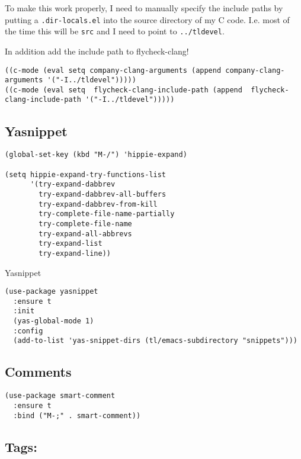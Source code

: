 \documentclass[12pt]{article}
\begin{document}
To make this work properly, I need to manually specify the include paths by
putting a \texttt{.dir-locals.el} into the source directory of my C code. I.e. most
of the time this will be \texttt{src} and I need to point to \texttt{../tldevel}. 

In addition add the include path to flycheck-clang! 

\begin{verbatim}
((c-mode (eval setq company-clang-arguments (append company-clang-arguments '("-I../tldevel")))))
((c-mode (eval setq  flycheck-clang-include-path (append  flycheck-clang-include-path '("-I../tldevel")))))      
\end{verbatim}

\subsection{Yasnippet}
\label{sec:orgb86e689}


\lstset{language=Lisp,label= ,caption= ,captionpos=b,numbers=none}
\begin{lstlisting}
(global-set-key (kbd "M-/") 'hippie-expand)

(setq hippie-expand-try-functions-list
      '(try-expand-dabbrev
        try-expand-dabbrev-all-buffers
        try-expand-dabbrev-from-kill
        try-complete-file-name-partially
        try-complete-file-name
        try-expand-all-abbrevs
        try-expand-list
        try-expand-line))
\end{lstlisting}

Yasnippet

\lstset{language=Lisp,label= ,caption= ,captionpos=b,numbers=none}
\begin{lstlisting}
(use-package yasnippet
  :ensure t
  :init
  (yas-global-mode 1)
  :config
  (add-to-list 'yas-snippet-dirs (tl/emacs-subdirectory "snippets")))

\end{lstlisting}

\subsection{Comments}
\label{sec:orgcf46dc5}
\lstset{language=Lisp,label= ,caption= ,captionpos=b,numbers=none}
\begin{lstlisting}
(use-package smart-comment
  :ensure t
  :bind ("M-;" . smart-comment))
\end{lstlisting}

\subsection{Tags:}
\label{sec:org97aaff2}
\end{document}
